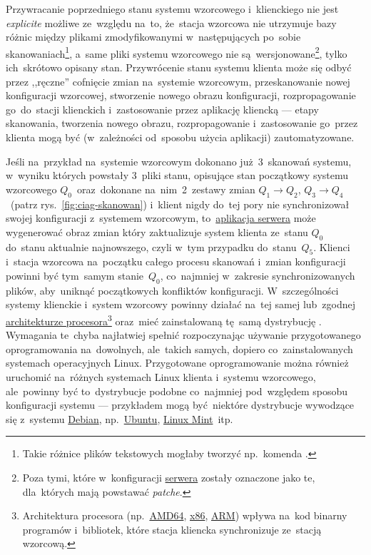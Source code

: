\documentclass[thesis]{subfiles}
\begin{document}
Przywracanie poprzedniego stanu systemu wzorcowego i~klienckiego nie jest \emph{explicite} możliwe ze~względu na~to, że~stacja wzorcowa nie utrzymuje bazy różnic między plikami zmodyfikowanymi w~następujących po~sobie skanowaniach\footnote{Takie różnice plików tekstowych mogłaby tworzyć np.~komenda .}, a~same pliki systemu wzorcowego nie są~wersjonowane\footnote{Poza tymi, które w~konfiguracji \hyperref[sec:srv-app]{serwera} zostały oznaczone jako te, dla~których mają powstawać \emph{patche}.}, tylko ich~skrótowo opisany stan. Przywrócenie stanu systemu klienta może się odbyć przez ,,ręczne'' cofnięcie zmian na~systemie wzorcowym, przeskanowanie nowej konfiguracji wzorcowej, stworzenie nowego obrazu konfiguracji, rozpropagowanie go~do~stacji klienckich i~zastosowanie przez aplikację kliencką --- etapy skanowania, tworzenia nowego obrazu, rozpropagowanie i~zastosowanie go~przez klienta mogą być (w~zależności od~sposobu użycia aplikacji) zautomatyzowane.

Jeśli na~przykład na~systemie wzorcowym dokonano już~3~skanowań systemu, w~wyniku których powstały 3~pliki stanu, opisujące stan początkowy systemu wzorcowego $Q_0$~oraz~dokonane na~nim~2~zestawy zmian $Q_1\rightarrow Q_2$, $Q_3\rightarrow Q_4$~(patrz rys.~\ref{fig:ciag-skanowan}) i~klient nigdy do~tej pory nie synchronizował swojej konfiguracji z~systemem wzorcowym, to~\hyperref[sec:srv-app]{aplikacja serwera} może wygenerować obraz zmian który zaktualizuje system klienta ze~stanu $Q_0$ do~stanu aktualnie najnowszego, czyli w~tym przypadku do~stanu~$Q_5$. Klienci i~stacja wzorcowa na~początku całego procesu skanowań i~zmian konfiguracji powinni być tym~samym stanie~$Q_0$, co~najmniej w~zakresie synchronizowanych plików, aby~uniknąć początkowych konfliktów konfiguracji. W~szczególności systemy klienckie i~system wzorcowy powinny działać na~tej samej lub~zgodnej \href{https://en.wikipedia.org/wiki/List_of_instruction_sets}{architekturze procesora}\footnote{Architektura procesora (np.~\href{https://en.wikipedia.org/wiki/X86-64}{AMD64}, \href{https://en.wikipedia.org/wiki/X86}{x86}, \href{https://en.wikipedia.org/wiki/ARM_architecture}{ARM}) wpływa na~kod binarny programów i~bibliotek, które stacja kliencka synchronizuje ze~stacją wzorcową.} oraz~mieć zainstalowaną tę~samą dystrybucję . Wymagania te~chyba najłatwiej spełnić rozpoczynając używanie przygotowanego oprogramowania na~dowolnych, ale~takich samych, dopiero co~zainstalowanych systemach operacyjnych Linux. Przygotowane oprogramowanie można również uruchomić na~różnych systemach Linux klienta i~systemu wzorcowego, ale~powinny być to~dystrybucje podobne co~najmniej pod~względem sposobu konfiguracji systemu --- przykładem mogą być~niektóre dystrybucje wywodzące się z~systemu \href{https://en.wikipedia.org/wiki/Debian}{Debian}, np.~\href{https://en.wikipedia.org/wiki/Ubuntu_(operating_system)}{Ubuntu}, \href{https://en.wikipedia.org/wiki/Linux_Mint}{Linux Mint}~itp.
\end{document}
